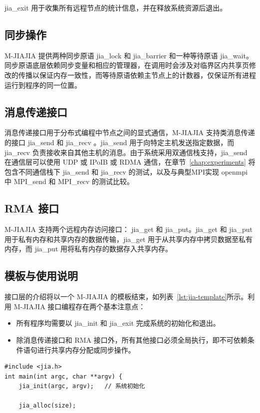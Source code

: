 {    jia\_exit 用于收集所有远程节点的统计信息，并在释放系统资源后退出。
    \subsection{同步操作}
    M-JIAJIA 提供两种同步原语 jia\_lock 和 jia\_barrier 和一种等待原语 jia\_wait。同步原语底层依赖同步变量和相应的管理器，在调用时会涉及对临界区内共享页修改的传播以保证内存一致性，而等待原语依赖主节点上的计数器，仅保证所有进程运行到程序的同一位置。

    \subsection{消息传递接口}
    消息传递接口用于分布式编程中节点之间的显式通信，M-JIAJIA 支持类消息传递的接口 jia\_send 和 jia\_recv 。jia\_send 用于向特定主机发送指定数据，而 jia\_recv 负责接收来自其他主机的消息。由于系统采用双通信栈支持，jia\_send 在通信层可以使用 UDP 或 IPoIB 或 RDMA 通信，在章节~\ref{chap:experiments} 将包含不同通信栈下 jia\_send 和 jia\_recv 的测试，以及与典型MPI实现 openmpi 中 MPI\_send 和 MPI\_recv 的测试比较。

    \subsection{RMA 接口}
    M-JIAJIA 支持两个远程内存访问接口： jia\_get 和 jia\_put。jia\_get 和 jia\_put 用于私有内存和共享内存的数据传输，jia\_get 用于从共享内存中拷贝数据至私有内存，而 jia\_put 用将私有内存的数据存入共享内存。
    \subsection{模板与使用说明}
    接口层的介绍将以一个 M-JIAJIA 的模板结束，如列表~\ref{lst:jia-template}所示。利用 M-JIAJIA 接口编程存在两个基本注意点：
    \begin{itemize}
        \item 所有程序均需要以 jia\_init 和 jia\_exit 完成系统的初始化和退出。
        \item 除消息传递接口和 RMA 接口外，所有其他接口必须全局执行，即不可依赖条件语句进行共享内存分配或同步操作。
    \end{itemize}
    \begin{lstlisting}[style=CStyle, caption={M-JIAJIA 应用模板}, label={lst:jia-template}]
#include <jia.h>
int main(int argc, char **argv) {
    jia_init(argc, argv);   // 系统初始化

    jia_alloc(size);
    

\end{lstlisting}}
